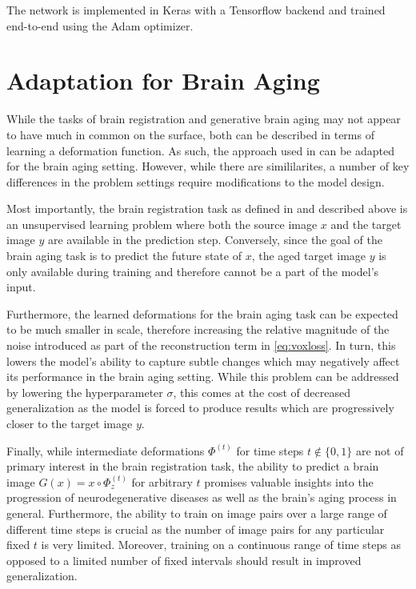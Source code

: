 The network is implemented in Keras with a Tensorflow backend and trained end-to-end using the Adam \cite{kingma2014adam} optimizer.

\section{Adaptation for Brain Aging}
\label{sec:ada}
While the tasks of brain registration and generative brain aging may not appear to have much in common on the surface, both can be described in terms of learning a deformation function. As such, the approach used in \cite{balakrishnan2019voxelmorph} can be adapted for the brain aging setting. However, while there are simililarites, a number of key differences in the problem settings require modifications to the model design.

Most importantly, the brain registration task as defined in \cite{balakrishnan2019voxelmorph} and described above is an unsupervised learning problem where both the source image $x$ and the target image $y$ are available in the prediction step. Conversely, since the goal of the brain aging task is to predict the future state of $x$, the aged target image $y$ is only available during training and therefore cannot be a part of the model's input.

Furthermore, the learned deformations for the brain aging task can be expected to be much smaller in scale, therefore increasing the relative magnitude of the noise introduced as part of the reconstruction term in \autoref{eq:voxloss}. In turn, this lowers the model's ability to capture subtle changes which may negatively affect its performance in the brain aging setting. While this problem can be addressed by lowering the hyperparameter $\sigma$, this comes at the cost of decreased generalization as the model is forced to produce results which are progressively closer to the target image $y$.

Finally, while intermediate deformations $\Phi^{(t)}$ for time steps $t \notin \{0, 1\}$ are not of primary interest in the brain registration task, the ability to predict a brain image $G(x) = x \circ \Phi_z^{(t)}$ for arbitrary $t$ promises valuable insights into the progression of neurodegenerative diseases as well as the brain's aging process in general.
Furthermore, the ability to train on image pairs over a large range of different time steps is crucial as the number of image pairs for any particular fixed $t$ is very limited. Moreover, training on a continuous range of time steps as opposed to a limited number of fixed intervals should result in improved generalization.

